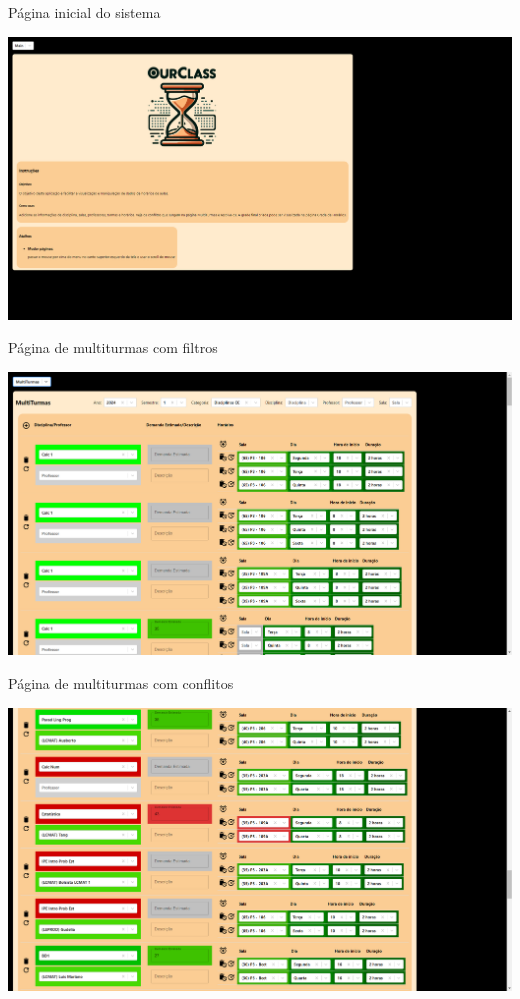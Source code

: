 \begin{MyCenteredFigure} \caption{Página inicial do sistema} \label{fig:main}
  \includegraphics[width=\textwidth]{files/img/2.02!7-resultados/1-Main.png}
\end{MyCenteredFigure}

\begin{MyCenteredFigure} \caption{Página de multiturmas com filtros} \label{fig:multiFiltros}
  \includegraphics[width=\textwidth]{files/img/2.02!7-resultados/2-Multiturmas-Filtros.png}
\end{MyCenteredFigure}

\begin{MyCenteredFigure} \caption{Página de multiturmas com conflitos} \label{fig:multiConflitos}
  \includegraphics[width=\textwidth]{files/img/2.02!7-resultados/3-Multiturmas-Conflitos.png}
\end{MyCenteredFigure}

